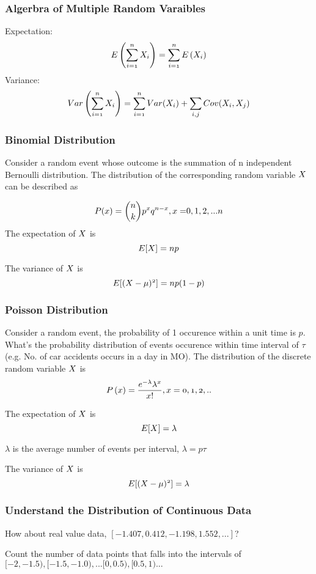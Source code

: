\documentclass[notheorems, aspectratio=54]{beamer}
\begin{document}
\begin{frame}
\frametitle{Algerbra of Multiple Random Varaibles}
Expectation: $$\mathnormal{E\left(\sum_{i=1}^n X_i\right)=\sum_{i=1}^n E\left( X_i\right)}$$
Variance: $$\mathnormal{{Var}\left(\sum_{i=1}^n X_i\right)= \sum_{i=1}^n {Var}(X_i)+ \sum_{i,j}{Cov}(X_i,X_j)}$$
\end{frame}



\begin{frame}
\frametitle{Binomial Distribution}
Consider a random event whose outcome is the summation of n independent Bernoulli distribution. The distribution of the corresponding random variable $\mathnormal{X}$ can be described as

$$ \mathnormal{P(x) =  {{n}\choose{k}} p^xq^{n-x}, x=}0, 1, 2, ...\mathnormal{n}$$
The expectation of $\mathnormal{X}$ is 
$$
\mathnormal{E[X]=np}
$$

The variance of $\mathnormal{X}$ is
$$
\mathnormal{E[(X-\mu)^2]=np(}1-\mathnormal{p)}
$$
\end{frame}

\begin{frame}
\frametitle{Poisson Distribution}
Consider a random event, the probability of 1 occurence within a unit time is $p$. What's the probability distribution of events occurence within time interval of $\tau$ (e.g. No. of car accidents occurs in a day in MO). The distribution of the discrete random variable $\mathnormal{X}$ is 
$$
\mathnormal{P\left( x \right) = \frac{{e^{ - \lambda } \lambda ^x }}{{x!}}, x = 0, 1, 2, ..}
$$

The expectation of $\mathnormal{X}$ is 
$$
\mathnormal{E[X]=\lambda}
$$

$\lambda$  is the average number of events per interval, $\lambda=p\tau$

The variance of $\mathnormal{X}$ is
$$
\mathnormal{E[(X-\mu)^2]=\lambda}
$$
\end{frame}


\begin{frame}
\frametitle{Understand the Distribution of Continuous Data}
How about real value data, $[-1.407, 0.412, -1.198, 1.552, ...]$? 

\vspace{3mm}
Count the number of data points that falls into the intervals of $[-2, -1.5), [-1.5, -1.0), ... [0, 0.5), [0.5, 1) ...$

\end{frame}
\end{document}
